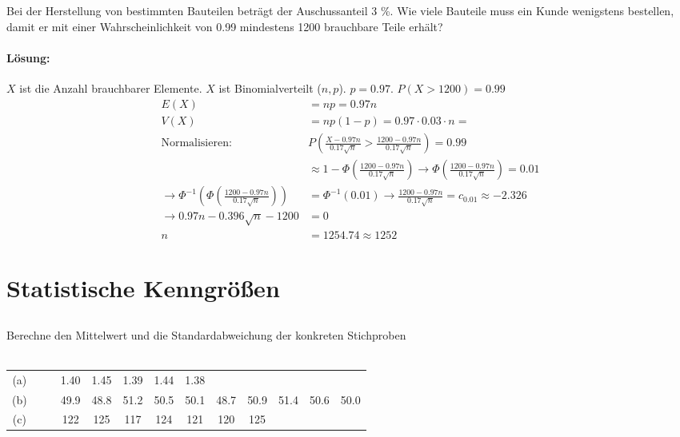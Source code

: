 \documentclass[ngerman]{scrartcl}
\begin{document}
\subsection{}
Bei der Herstellung von bestimmten Bauteilen beträgt der Auschussanteil 3 \%. Wie viele Bauteile muss ein Kunde wenigstens bestellen, damit er mit einer Wahrscheinlichkeit von 0.99 mindestens 1200 brauchbare Teile erhält?
\paragraph{Lösung:}
$X$ ist die Anzahl brauchbarer Elemente. $X$ ist Binomialverteilt ($n,p$). $p=0.97$. $P(X>1200) = 0.99$
\begin{align*}
E(X) &= np = 0.97n\\
V(X) &= np(1-p) = 0.97\cdot 0.03\cdot n = \\
\text{Normalisieren: } &P\left(\frac{X- 0.97n}{0.17\sqrt{n}} > \frac{1200 - 0.97n}{0.17\sqrt{n}}\right)=0.99\\
&\approx 1 - \Phi\left(\frac{1200-0.97n}{0.17\sqrt{n}}\right) \rightarrow \Phi\left(\frac{1200-0.97n}{0.17\sqrt{n}}\right) = 0.01\\
\rightarrow \Phi^{-1}\left(\Phi\left(\frac{1200-0.97n}{0.17\sqrt{n}}\right)\right) &= \Phi^{-1}(0.01)\rightarrow \frac{1200 - 0.97n}{0.17\sqrt{n}} = c_{0.01} \approx -2.326\\
\rightarrow 0.97n - 0.396\sqrt{n} - 1200 &= 0 \\
n &= 1254.74 \approx 1252
\end{align*}

\section{Statistische Kenngrößen}
\subsection{}
Berechne den Mittelwert und die Standardabweichung der konkreten Stichproben\\
\\
\begin{tabular}{c c c c c c c c c c c c c}
(a) & & & 1.40& 1.45& 1.39& 1.44& 1.38& & & & & \\
(b) & & & 49.9& 48.8& 51.2& 50.5& 50.1& 48.7& 50.9& 51.4& 50.6& 50.0\\
(c) & & & 122& 125& 117& 124& 121& 120& 125& & & \\
\end{tabular}
\end{document}
